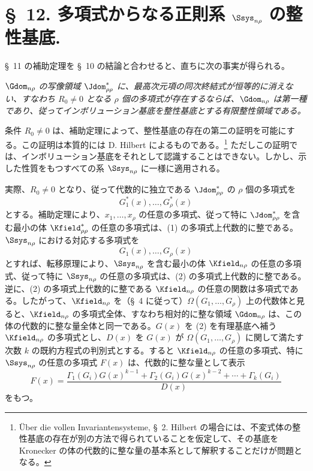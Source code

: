 \documentclass[11pt]{article}
\begin{document}
\section*{\S\ 12. 多項式からなる正則系 $\Ssys_{n\rho}$ の整性基底.}

\S\ 11 の補助定理を \S\ 10 の結論と合わせると、直ちに次の事実が得られる。

\emph{$\Gdom_{n\rho}$ の写像領域 $\Jdom^*_{\rho\rho}$ に、最高次元項の同次終結式が恒等的に消えない、すなわち $R_0\ne0$ となる $\rho$ 個の多項式が存在するならば、$\Gdom_{n\rho}$ は第一種であり、従ってインボリューション基底を整性基底とする有限整性領域である。}

条件 $R_0\ne0$ は、補助定理によって、整性基底の存在の第二の証明を可能にする。この証明は本質的には D. Hilbert によるものである。\footnote{Über die vollen Invariantensysteme, \S\ 2. Hilbert の場合には、不変式体の整性基底の存在が別の方法で得られていることを仮定して、その基底を Kronecker の体の代数的に整な量の基本系として解釈することだけが問題となる。} ただしこの証明では、インボリューション基底をそれとして認識することはできない。しかし、示した性質をもつすべての系 $\Ssys_{n\rho}$ に一様に適用される。

実際、$R_0\ne0$ となり、従って代数的に独立である $\Jdom^*_{\rho\rho}$ の $\rho$ 個の多項式を
\begin{equation}
  G_1^*(x),\ldots,G_\rho^*(x)
\tag{1}
\end{equation}
とする。補助定理により、$x_1,\ldots,x_\rho$ の任意の多項式、従って特に $\Jdom^*_{\rho\rho}$ を含む最小の体 $\Kfield^*_{\rho\rho}$ の任意の多項式は、(1) の多項式上代数的に整である。$\Ssys_{n\rho}$ における対応する多項式を
\begin{equation}
  G_1(x),\ldots,G_\rho(x)
\tag{2}
\end{equation}
とすれば、転移原理により、$\Ssys_{n\rho}$ を含む最小の体 $\Kfield_{n\rho}$ の任意の多項式、従って特に $\Ssys_{n\rho}$ の任意の多項式は、(2) の多項式上代数的に整である。逆に、(2) の多項式上代数的に整である $\Kfield_{n\rho}$ の任意の関数は多項式である。したがって、$\Kfield_{n\rho}$ を（\S\ 4 に従って）$\Omega(G_1,\ldots,G_\rho)$ 上の代数体と見ると、$\Kfield_{n\rho}$ の多項式全体、すなわち相対的に整な領域 $\Gdom_{n\rho}$ は、この体の代数的に整な量全体と同一である。$G(x)$ を (2) を有理基底へ補う $\Kfield_{n\rho}$ の多項式とし、$D(x)$ を $G(x)$ が $\Omega(G_1,\ldots,G_\rho)$ に関して満たす次数 $k$ の既約方程式の判別式とする。すると $\Kfield_{n\rho}$ の任意の多項式、特に $\Ssys_{n\rho}$ の任意の多項式 $F(x)$ は、代数的に整な量として表示
\begin{equation}
  F(x)=\frac{\Gamma_1(G_i)G(x)^{k-1}+\Gamma_2(G_i)G(x)^{k-2}+\cdots+\Gamma_k(G_i)}{D(x)}
\tag{3}
\end{equation}
をもつ。
\end{document}
